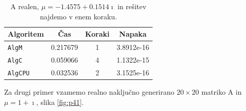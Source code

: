 \documentclass[12pt,a4paper]{amsart}
\theoremstyle{definition}
\theoremstyle{plain}
\begin{document}
\begin{table}[H]
\caption{A realen, $\mu = -1.4575 + 0.1514 \imath$ in rešitev najdemo v enem koraku.}
\begin{tabular}{|l|c|c|c|}
\hline
Algoritem & Čas & Koraki & Napaka\\
\hline
\hline
\verb+AlgM+ &0.217679&1&3.8912e-16\\
\hline
\verb+AlgC+ &0.059066 & 4& 1.1322e-15\\
\hline
\verb+AlgCPU+ &0.032536&2&3.1525e-16\\
\hline
\end{tabular}

\label{t3}
\end{table}

Za drugi primer vzamemo realno naključno generirano $20\times 20$ matriko A in $\mu = 1 + \imath$, slika \ref{fig:p41}.
\end{document}
